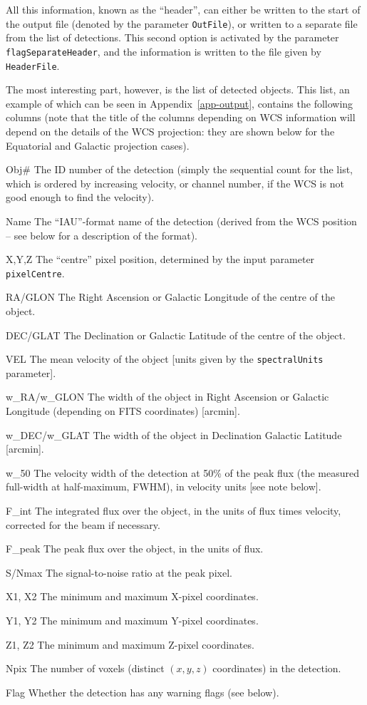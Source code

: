 All this information, known as the ``header'', can either be written
to the start of the output file (denoted by the parameter
\texttt{OutFile}), or written to a separate file from the list of
detections. This second option is activated by the parameter
\texttt{flagSeparateHeader}, and the information is written to the
file given by \texttt{HeaderFile}.

The most interesting part, however, is the list of detected
objects. This list, an example of which can be seen in
Appendix~\ref{app-output}, contains the following columns (note that
the title of the columns depending on WCS information will depend on
the details of the WCS projection: they are shown below for the
Equatorial and Galactic projection cases).

\begin{Lentry}
\item[{Obj\#}] The ID number of the detection (simply the
  sequential count for the list, which is ordered by increasing
  velocity, or channel number, if the WCS is not good enough to find
  the velocity).
\item[{Name}] The ``IAU''-format name of the detection (derived from the
  WCS position -- see below for a description of the format).
\item[{X,Y,Z}] The ``centre'' pixel position, determined by the input
  parameter \texttt{pixelCentre}.
\item[{RA/GLON}] The Right Ascension or Galactic Longitude of the centre
  of the object.
\item[{DEC/GLAT}] The Declination or Galactic Latitude of the centre of
  the object.
\item[{VEL}] The mean velocity of the object [units given by the
  \texttt{spectralUnits} parameter].
\item[{w\_RA/w\_GLON}] The width of the object in Right Ascension or
  Galactic Longitude (depending on FITS coordinates) [arcmin].
\item[{w\_DEC/w\_GLAT}] The width of the object in Declination Galactic
  Latitude [arcmin].
\item[{w\_50}] The velocity width of the detection at 50\% of the peak
  flux (the measured full-width at half-maximum, FWHM), in velocity
  units [see note below].
\item[{F\_int}] The integrated flux over the object, in the units of
  flux times velocity, corrected for the beam if necessary.
\item[{F\_peak}] The peak flux over the object, in the units of flux.
\item[{S/Nmax}] The signal-to-noise ratio at the peak pixel.
\item[{X1, X2}] The minimum and maximum X-pixel coordinates.
\item[{Y1, Y2}] The minimum and maximum Y-pixel coordinates.
\item[{Z1, Z2}] The minimum and maximum Z-pixel coordinates.
\item[{Npix}] The number of voxels (\ie distinct $(x,y,z)$ coordinates)
  in the detection.
\item[{Flag}] Whether the detection has any warning flags (see below).
\end{Lentry}

